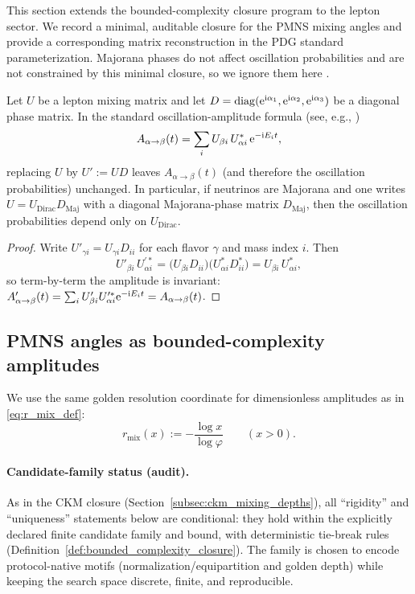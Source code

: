 This section extends the bounded-complexity closure program to the lepton sector.
We record a minimal, auditable closure for the PMNS mixing angles and provide a corresponding matrix reconstruction in the PDG standard parameterization.
Majorana phases do not affect oscillation probabilities and are not constrained by this minimal closure, so we ignore them here \cite{PDGRPP2024}.

\begin{lemma}\label{lem:majorana_phases_cancel}
Let $U$ be a lepton mixing matrix and let $D=\mathrm{diag}(\mathrm{e}^{\mathrm{i}\alpha_1},\mathrm{e}^{\mathrm{i}\alpha_2},\mathrm{e}^{\mathrm{i}\alpha_3})$ be a diagonal phase matrix.
In the standard oscillation-amplitude formula (see, e.g., \cite{PDGRPP2024})
\[
A_{\alpha\to\beta}(t)=\sum_{i} U_{\beta i}\,U_{\alpha i}^\ast\,\mathrm{e}^{-\mathrm{i} E_i t},
\]
replacing $U$ by $U':=UD$ leaves $A_{\alpha\to\beta}(t)$ (and therefore the oscillation probabilities) unchanged.
In particular, if neutrinos are Majorana and one writes $U=U_{\mathrm{Dirac}}D_{\mathrm{Maj}}$ with a diagonal Majorana-phase matrix $D_{\mathrm{Maj}}$, then the oscillation probabilities depend only on $U_{\mathrm{Dirac}}$.
\end{lemma}
\begin{proof}
Write $U'_{\gamma i}=U_{\gamma i}D_{ii}$ for each flavor $\gamma$ and mass index $i$.
Then
\[
U'_{\beta i}\,U_{\alpha i}^{\prime\ast}
=\bigl(U_{\beta i}D_{ii}\bigr)\bigl(U_{\alpha i}^\ast D_{ii}^\ast\bigr)
=U_{\beta i}\,U_{\alpha i}^\ast,
\]
so term-by-term the amplitude is invariant:
$A'_{\alpha\to\beta}(t)=\sum_i U'_{\beta i}U_{\alpha i}^{\prime\ast}\mathrm{e}^{-\mathrm{i} E_i t}=A_{\alpha\to\beta}(t)$.
\end{proof}

\subsection{PMNS angles as bounded-complexity amplitudes}

We use the same golden resolution coordinate for dimensionless amplitudes as in \eqref{eq:r_mix_def}:
\[
r_{\mathrm{mix}}(x):=-\frac{\log x}{\log\varphi}\qquad(x>0).
\]

\paragraph{Candidate-family status (audit).}
\AuditTag As in the CKM closure (Section~\ref{subsec:ckm_mixing_depths}), all ``rigidity'' and ``uniqueness'' statements below are conditional: they hold within the explicitly declared finite candidate family and bound, with deterministic tie-break rules (Definition~\ref{def:bounded_complexity_closure}).
The family is chosen to encode protocol-native motifs (normalization/equipartition and golden depth) while keeping the search space discrete, finite, and reproducible.

